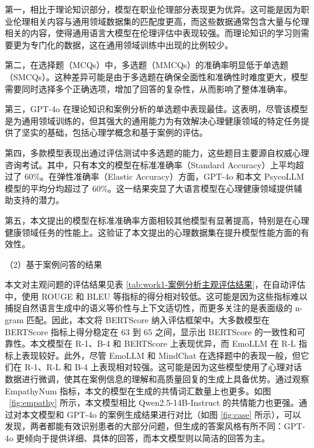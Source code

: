 第一，相比于理论知识部分，模型在职业伦理部分表现更为优异。这可能是因为职业伦理相关内容与通用领域数据集的匹配度更高，而这些数据通常包含大量与伦理相关的内容，使得通用语言大模型在伦理评估中表现较强。而理论知识的学习则需要更为专门化的数据，这在通用领域训练中出现的比例较少。

第二，在选择题（MCQs）中，多选题（MMCQs）的准确率明显低于单选题（SMCQs）。这种差异可能是由于多选题在确保全面性和准确性时难度更大，模型需要同时选择多个正确选项，增加了回答的复杂性，从而影响了整体准确率。

第三，GPT-4o 在理论知识和案例分析的单选题中表现最佳。这表明，尽管该模型是为通用领域训练的，但其强大的通用能力为有效解决心理健康领域的特定任务提供了坚实的基础，包括心理学概念和基于案例的评估。

第四，多款模型表现出通过评估测试中多选题的能力，这些题目主要源自权威心理咨询考试。其中，只有本文的模型在标准准确率（Standard Accuracy）上平均超过了 60\%。在弹性准确率（Elastic Accuracy）方面，GPT-4o 和本文 PsycoLLM 模型的平均分均超过了 60\%。这一结果突显了大语言模型在心理健康领域提供辅助支持的潜力。

第五，本文提出的模型在标准准确率方面相较其他模型有显著提高，特别是在心理健康领域任务的性能上。这验证了本文提出的心理数据集在提升模型性能方面的有效性。

（2）基于案例问答的结果

本文对主观问题的评估结果见表 \ref{tab:work1-案例分析主观评估结果}，在自动评估中，使用 ROUGE 和 BLEU 等指标的得分相对较低。这可能是因为这些指标难以捕捉自然语言生成中的语义等价性与上下文适切性，而更多关注的是表面级的 n-gram 匹配。因此，本文将 BERTScore 纳入评估框架中。大多数模型在 BERTScore 指标上得分稳定在 63 到 65 之间，显示出 BERTScore 的一致性和可靠性。本文模型在 R-1、B-4 和 BERTScore 上表现优异，而 EmoLLM 在 R-L 指标上表现较好。此外，尽管 EmoLLM 和 MindChat 在选择题中的表现一般，但它们在 R-1、R-L 和 B-4 上表现相对较强。这可能是因为这些模型使用了心理对话数据进行微调，使其在案例信息的理解和高质量回复的生成上具备优势。通过观察 EmpathyNum 指标，本文的模型在生成的共情词汇数量上也更多。如图 ~\ref{fig:empathy} 所示，本文模型相比 Qwen2.5-14B-Instruct 的共情能力也更强。通过对本文模型和 GPT-4o 的案例生成结果进行对比（如图 \ref{fig:case} 所示），可以发现，两者都能有效识别患者的大部分问题，但生成的答案风格有所不同：GPT-4o 更倾向于提供详细、具体的回答，而本文模型则以简洁的回答为主。

